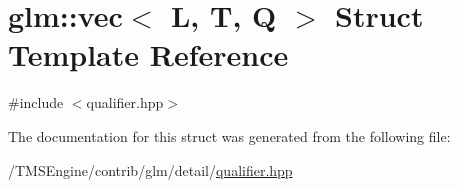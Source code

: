 \hypertarget{structglm_1_1vec}{}\section{glm\+:\+:vec$<$ L, T, Q $>$ Struct Template Reference}
\label{structglm_1_1vec}


{\ttfamily \#include $<$qualifier.\+hpp$>$}



The documentation for this struct was generated from the following file\+:\begin{DoxyCompactItemize}
\item 
/\+T\+M\+S\+Engine/contrib/glm/detail/\hyperlink{qualifier_8hpp}{qualifier.\+hpp}\end{DoxyCompactItemize}
